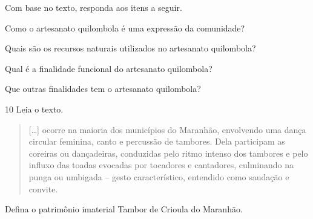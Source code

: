 Com base no texto, responda aos itens a seguir.

\begin{escolha}
\item Como o artesanato quilombola é uma expressão da comunidade?

\item Quais são os recursos naturais utilizados no artesanato quilombola?

\item Qual é a finalidade funcional do artesanato quilombola?

\item Que outras finalidades tem o artesanato quilombola?
\end{escolha}

\num{10} Leia o texto.
%


\begin{quote}
{[}\ldots{}{]} ocorre na maioria dos municípios do
Maranhão, envolvendo uma dança circular feminina, canto e percussão de
tambores. Dela participam as coreiras ou dançadeiras, conduzidas pelo
ritmo intenso dos tambores e pelo influxo das toadas evocadas por
tocadores e cantadores, culminando na punga ou umbigada -- gesto
característico, entendido como saudação e convite.

\end{quote}

Defina o patrimônio imaterial Tambor de Crioula do Maranhão.



